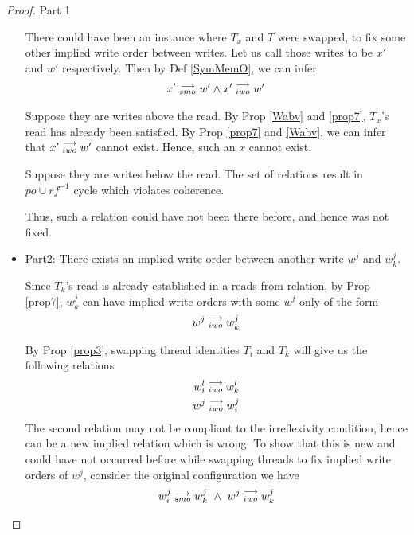 \begin{proof}{Part 1}
\begin{itemize}
                        There could have been an instance where $T_x$ and $T$ were swapped, to fix some other implied write order between writes. 
                        Let us call those writes to be $x'$ and $w'$ respectively.
                        Then by Def \ref{SymMemO}, we can infer 
                        \begin{align*}
                            x'\stackrel{\longrightarrow}{_{smo}}w' \wedge x'\stackrel{\longrightarrow}{_{iwo}}w'
                        \end{align*}
                        
                        Suppose they are writes above the read.                         
                        By Prop \ref{Wabv} and \ref{prop7}, $T_x$'s read has already been satisfied. By Prop \ref{prop7} and \ref{Wabv}, we can infer that $x'\stackrel{\longrightarrow}{_{iwo}}w'$ cannot exist. Hence, such an $x$ cannot exist. 
                        
                        Suppose they are writes below the read.
                        The set of relations result in $po \cup rf^{-1}$ cycle which violates coherence.  

                        

                        Thus, such a relation could have not been there before, and hence was not fixed. 


                    \item Part2: There exists an implied write order between another write $w^j$ and $w_k^j$.

                        Since $T_k$'s read is already established in a reads-from relation, by Prop \ref{prop7}, $w_k^j$ can have implied   write     orders with some $w^j$ only of the form 
                        \begin{align*}
                            w^j\stackrel{\longrightarrow}{_{iwo}}w_k^j
                        \end{align*}

                        By Prop \ref{prop3}, swapping thread identities $T_i$ and $T_k$ will give us the following relations 
                        \begin{align*}
                            w_i^l\stackrel{\longrightarrow}{_{iwo}}w_k^l \\ 
                            w^j\stackrel{\longrightarrow}{_{iwo}}w_i^j 
                        \end{align*}
                        The second relation may not be compliant to the irreflexivity condition, hence can be a new implied relation which  is   wrong. To show that this is new and could have not occurred before while swapping threads to fix implied write  orders of  $w^j$, consider the original configuration we have 
                        \begin{align*}
                            \reln{w_i^j}{smo}{w_k^j} \ \wedge \ \reln{w^j}{iwo}{w_k^j}
                        \end{align*}


\end{itemize}
\end{proof}
